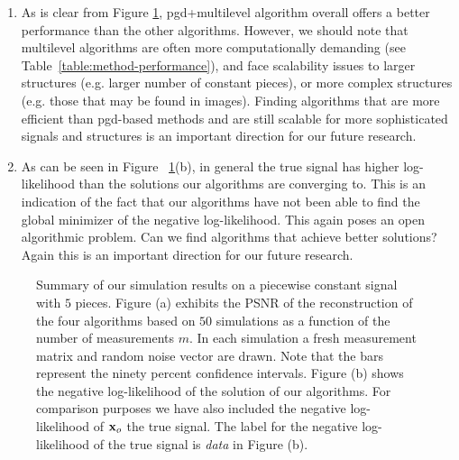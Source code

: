 \documentclass[onecolumn]{IEEEtran}
\begin{document}
\begin{enumerate}
\item As is clear from Figure \ref{fig:method-performance}, pgd+multilevel algorithm overall offers a better performance than the other algorithms. However, we should note that multilevel algorithms are often more computationally demanding (see Table~\ref{table:method-performance}), and face scalability issues to larger structures (e.g. larger number of constant pieces), or more complex structures (e.g. those that may be found in images). Finding algorithms that are more efficient than pgd-based methods and are still scalable for more sophisticated signals and structures is an important direction for our future research. 


\item As can be seen in Figure ~\ref{fig:method-performance}(b), in general the true signal has higher log-likelihood than the solutions our algorithms are converging to. This is an indication of the fact that our algorithms have not been able to find the global minimizer of the negative log-likelihood. This again poses an open algorithmic problem. Can we find algorithms that achieve better solutions? Again this is an important direction for our future research.  

\end{enumerate}






\begin{figure}
  \centering

  \caption{Summary of our simulation results on a piecewise constant signal with $5$ pieces. Figure (a) exhibits the PSNR of the reconstruction of the four algorithms based on $50$ simulations as a function of the number of measurements $m$. In each simulation a fresh measurement matrix and random noise vector are drawn. Note that the bars represent the ninety percent confidence intervals. Figure (b) shows the negative log-likelihood of the solution of our algorithms. For comparison purposes we have also included the negative log-likelihood of ${\bf x}_o$ the true signal. The label for the negative log-likelihood of the true signal is {\em data} in Figure (b). \label{fig:method-performance}}
\end{figure}
\end{document}
